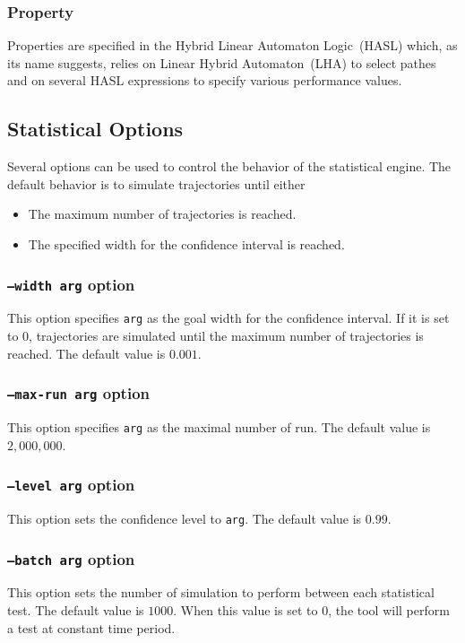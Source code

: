 \documentclass{article}
\begin{document}
\subsubsection{Property}
Properties are specified in the Hybrid Linear Automaton Logic~(HASL)
which, as its name suggests, relies on Linear Hybrid Automaton~(LHA) to
select pathes and on several HASL expressions to specify various
performance values.


\subsection{Statistical Options}
Several options can be used to control the behavior of the statistical engine.
The default behavior is to simulate trajectories until either
\begin{itemize}
\item The maximum number of trajectories is reached.
\item The specified width for the confidence interval is reached.
\end{itemize}

\subsubsection{\texttt{--width arg}  option}
This option specifies \texttt{arg} as the goal width for the
confidence interval. If it is set to $0$, trajectories are simulated
until the maximum number of trajectories is reached.  The default
value is $0.001$.

\subsubsection{\texttt{--max-run arg}  option}
This option specifies \texttt{arg} as the maximal number of run.
The default value is $2,000,000$.

\subsubsection{\texttt{--level arg}  option}
This option sets the confidence level to \texttt{arg}.
The default value is $0.99$.

\subsubsection{\texttt{--batch arg}  option}
This option sets the number of simulation to perform between each
statistical test.  The default value is $1000$. When this value is 
set to $0$, the tool will perform a test at constant time period.
\end{document}
